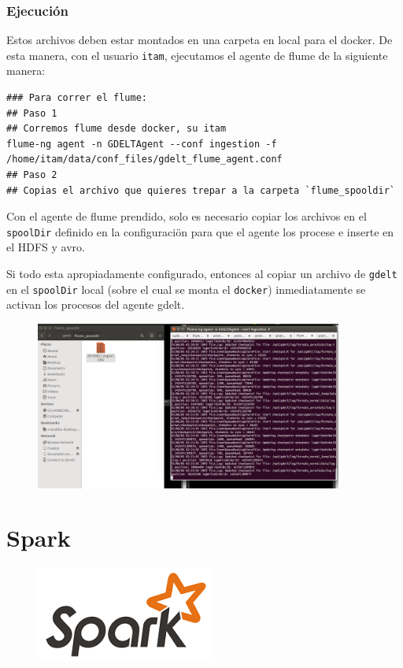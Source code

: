 \documentclass[]{article}
\begin{document}
\subsubsection{Ejecución}\label{ejecucion}

Estos archivos deben estar montados en una carpeta en local para el
docker. De esta manera, con el usuario \texttt{itam}, ejecutamos el
agente de flume de la siguiente manera:

\begin{verbatim}
### Para correr el flume:
## Paso 1
## Corremos flume desde docker, su itam
flume-ng agent -n GDELTAgent --conf ingestion -f /home/itam/data/conf_files/gdelt_flume_agent.conf
## Paso 2
## Copias el archivo que quieres trepar a la carpeta `flume_spooldir`
\end{verbatim}

Con el agente de flume prendido, solo es necesario copiar los archivos
en el \texttt{spoolDir} definido en la configuraciön para que el agente
los procese e inserte en el HDFS y avro.

Si todo esta apropiadamente configurado, entonces al copiar un archivo
de \texttt{gdelt} en el \texttt{spoolDir} local (sobre el cual se monta
el \texttt{docker}) inmediatamente se activan los procesos del agente
gdelt.

\begin{figure}[H]
\centering
\includegraphics[width=0.9\textwidth]{img/ejecucion_flume.png}
\end{figure}

\section{Spark}\label{spark}

\begin{figure}[H]
\centering
\includegraphics[width=0.4 \textwidth]{img/spark1.png}
\end{figure}
\end{document}
